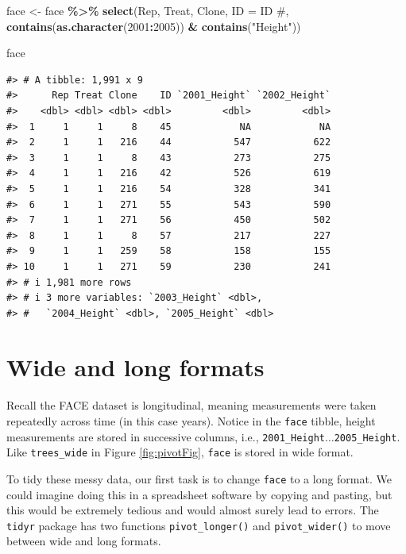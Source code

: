 \documentclass[
  11pt,
]{krantz}
\newenvironment{Shaded}{\begin{snugshade}}{\end{snugshade}}
\newcommand{\DataTypeTok}[1]{\textcolor[rgb]{0.13,0.29,0.53}{#1}}
\newcommand{\DecValTok}[1]{\textcolor[rgb]{0.00,0.00,0.81}{#1}}
\newcommand{\KeywordTok}[1]{\textcolor[rgb]{0.13,0.29,0.53}{\textbf{#1}}}
\newcommand{\NormalTok}[1]{#1}
\newcommand{\OperatorTok}[1]{\textcolor[rgb]{0.81,0.36,0.00}{\textbf{#1}}}
\newcommand{\StringTok}[1]{\textcolor[rgb]{0.31,0.60,0.02}{#1}}
\theoremstyle{definition}
\theoremstyle{definition}
\theoremstyle{definition}
\theoremstyle{definition}
\theoremstyle{remark}
\begin{document}
\begin{Shaded}
\begin{Highlighting}[]
\NormalTok{face \textless{}{-}}\StringTok{ }\NormalTok{face }\OperatorTok{\%\textgreater{}\%}
\StringTok{  }\KeywordTok{select}\NormalTok{(Rep, Treat, Clone, }\DataTypeTok{ID =} \StringTok{\textasciigrave{}}\DataTypeTok{ID \#}\StringTok{\textasciigrave{}}\NormalTok{,}
        \KeywordTok{contains}\NormalTok{(}\KeywordTok{as.character}\NormalTok{(}\DecValTok{2001}\OperatorTok{:}\DecValTok{2005}\NormalTok{)) }\OperatorTok{\&}\StringTok{ }\KeywordTok{contains}\NormalTok{(}\StringTok{"Height"}\NormalTok{))}
         
\NormalTok{face}
\end{Highlighting}
\end{Shaded}

\begin{verbatim}
#> # A tibble: 1,991 x 9
#>      Rep Treat Clone    ID `2001_Height` `2002_Height`
#>    <dbl> <dbl> <dbl> <dbl>         <dbl>         <dbl>
#>  1     1     1     8    45            NA            NA
#>  2     1     1   216    44           547           622
#>  3     1     1     8    43           273           275
#>  4     1     1   216    42           526           619
#>  5     1     1   216    54           328           341
#>  6     1     1   271    55           543           590
#>  7     1     1   271    56           450           502
#>  8     1     1     8    57           217           227
#>  9     1     1   259    58           158           155
#> 10     1     1   271    59           230           241
#> # i 1,981 more rows
#> # i 3 more variables: `2003_Height` <dbl>,
#> #   `2004_Height` <dbl>, `2005_Height` <dbl>
\end{verbatim}

\hypertarget{tidyrReshape}{%
\section{Wide and long formats}\label{tidyrReshape}}

Recall the FACE dataset is longitudinal, meaning measurements were taken repeatedly across time (in this case years). Notice in the \texttt{face} tibble, height measurements are stored in successive columns, i.e., \texttt{\textasciigrave{}2001\_Height\textasciigrave{}}\(\ldots\)\texttt{\textasciigrave{}2005\_Height\textasciigrave{}}. Like \texttt{trees\_wide} in Figure \ref{fig:pivotFig}, \texttt{face} is stored in wide format.

To tidy these messy data, our first task is to change \texttt{face} to a long format. We could imagine doing this in a spreadsheet software by copying and pasting, but this would be extremely tedious and would almost surely lead to errors. The \texttt{tidyr} package has two functions \texttt{pivot\_longer()} and \texttt{pivot\_wider()} to move between wide and long formats.
\end{document}
